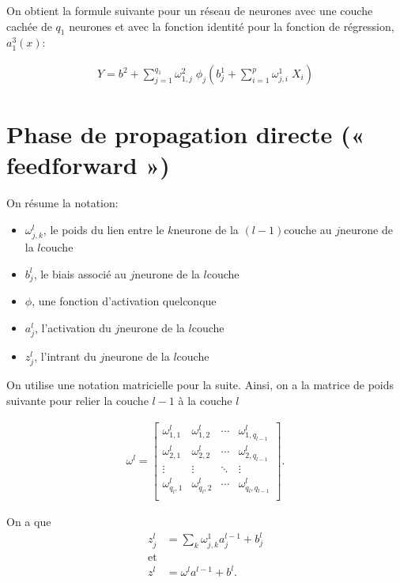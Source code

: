 On obtient la formule suivante pour un réseau de neurones avec une couche cachée de $q_1$ neurones et avec la fonction identité pour la fonction de régression, $a_1^3(x)$:  

\begin{align*}
Y=  b^2  + \sum_{j=1}^{q_1}  \omega_{1,j}^2  \; \phi_j \left(b_j^1 + \sum_{i=1}^p \omega_{j,i}^1 \; X_i \right)
\end{align*}


\section{Phase de propagation directe (« feedforward »)}
\label{sec:RN:feedforward}

On résume la notation:

\begin{itemize}
\item $ \omega_{j,k}^l$, le poids du lien entre le $k$\ieme  neurone de la $(l-1)$\ieme couche au $j$\ieme neurone de la $l$\ieme couche
\item $b_j^l$, le biais associé au $j$\ieme neurone de la $l$\ieme couche
\item $\phi$, une fonction d'activation quelconque
\item $a_j^l$, l'activation du $j$\ieme neurone de la $l$\ieme couche
\item $z_j^l$, l'intrant du $j$\ieme neurone de la $l$\ieme couche
\end{itemize}

On utilise une notation matricielle pour la suite.
Ainsi, on a la matrice de poids suivante pour relier la couche $l-1$ à la couche $l$

\begin{align*}
\omega^l = 
\begin{bmatrix}
\omega^l_{1,1} &\omega^l_{1,2} & \cdots &\omega^l_{1,q_{l-1}}\\
\omega^l_{2,1} &\omega^l_{2,2} & \cdots &\omega^l_{2,q_{l-1}}\\
\vdots & \vdots &\ddots & \vdots \\
\omega^l_{q_l,1} &\omega^l_{q_l,2} & \cdots &\omega^l_{q_l,q_{l-1}}\\
\end{bmatrix}.
\end{align*}

On a que 
\begin{align*}
z_j^l&= \sum_k \omega_{j,k}^1 a_j^{l-1} + b_j^l\\
\text{et}\\
z^l&= \omega^l a^{l-1} + b^l.
\end{align*}

